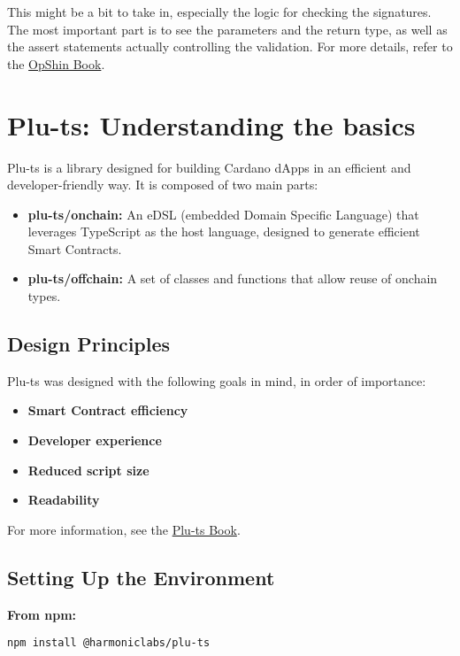 This might be a bit to take in, especially the logic for checking the signatures. The most important part is to see the parameters and the return type, as well as the assert statements actually controlling the validation. For more details, refer to the \href{https://book.opshin.dev/}{OpShin Book}.

\section{Plu-ts: Understanding the basics} \label{sec:Languages}

Plu-ts is a library designed for building Cardano dApps in an efficient and developer-friendly way. It is composed of two main parts:

\begin{itemize}
    \item \textbf{plu-ts/onchain:} An eDSL (embedded Domain Specific Language) that leverages TypeScript as the host language, designed to generate efficient Smart Contracts.
    \item \textbf{plu-ts/offchain:} A set of classes and functions that allow reuse of onchain types.
\end{itemize}

\subsection{Design Principles}
Plu-ts was designed with the following goals in mind, in order of importance:

\begin{itemize}
    \item \textbf{Smart Contract efficiency}
    \item \textbf{Developer experience}
    \item \textbf{Reduced script size}
    \item \textbf{Readability}
\end{itemize}

For more information, see the \href{https://book.plu-ts.dev/}{Plu-ts Book}.

\subsection{Setting Up the Environment}


\textbf{From npm:}
\begin{verbatim}
npm install @harmoniclabs/plu-ts
\end{verbatim}

